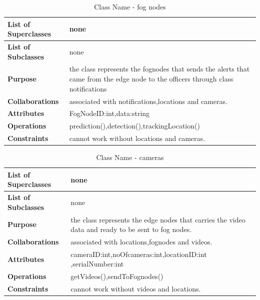 \documentclass[12pt]{article}
\begin{document}
\begin{table}[h!]
\caption{Class Name - fog nodes}
\label{tab:my-table}
\begin{tabular}{|p{}|p{}|}


 \hline
\textbf{List of Superclasses}  & none                                                     
\\ \hline
\textbf{List of Subclasses}    & none                                                                    
\\ \hline
\textbf{Purpose}               & the class represents the fognodes that sends the alerts that came from the edge node to the officers through class notifications                                                                        
\\ \hline
\textbf{Collaborations}        & associated with notifications,locations and cameras.
\\ \hline
\textbf{Attributes}  & FogNodeID:int,data:string
\\ \hline
\textbf{Operations} & prediction(),detection(),trackingLocation()
\\ \hline
\textbf{Constraints} & cannot work without locations and cameras.
\\ \hline
\end{tabular}
\end{table}


\begin{table}[h!]
\caption{Class Name - cameras}
\label{tab:my-table}
\begin{tabular}{|p{}|p{}|}


 \hline
\textbf{List of Superclasses}  & none                                                     
\\ \hline
\textbf{List of Subclasses}    & none                                                                    
\\ \hline
\textbf{Purpose}               & the class represents the edge nodes that carries the video data and ready to be sent to fog nodes.                                                                       
\\ \hline
\textbf{Collaborations}        & associated with locations,fognodes and videos.
\\ \hline
\textbf{Attributes}  & cameraID:int,noOfcameras:int,locationID:int
,serialNumber:int
\\ \hline
\textbf{Operations} & getVideos(),sendToFognodes()
\\ \hline
\textbf{Constraints} & cannot work without videos and locations.
\\ \hline
\end{tabular}
\end{table}
\end{document}
